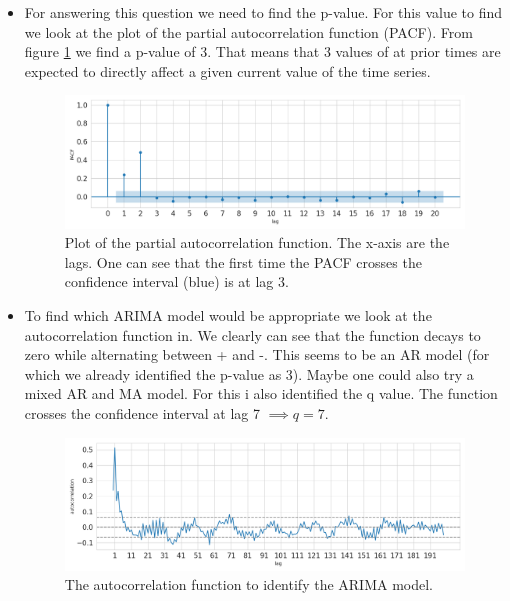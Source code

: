 \documentclass[]{article}
\begin{document}
\begin{itemize}
		\item For answering this question we need to find the p-value. For this value to find we look at the plot of the partial autocorrelation function (PACF). From figure \ref{fig:pacf} we find a p-value of 3. That means that 3 values of at prior times are expected to directly affect a given current value of the time series.
		\begin{figure}
			\centering
			\includegraphics[width=1\textwidth]{images/partialautocorrelation.png}
			\caption{Plot of the partial autocorrelation function. The x-axis are the lags. One can see that the first time the PACF crosses the confidence interval (blue) is at lag 3.}
			\label{fig:pacf}
		\end{figure}
		\item To find which ARIMA model would be appropriate we look at the autocorrelation function in. We clearly can see that the function decays to zero while alternating between + and -. This seems to be an AR model (for which we already identified the p-value as 3). Maybe one could also try a mixed AR and MA model. For this i also identified the q value. The function crosses the confidence interval at lag 7 $\implies q=7$. 
		\begin{figure}
			\centering
			\includegraphics[width=1\textwidth]{images/autocorrelation_identification.png}
			\caption{The autocorrelation function to identify the ARIMA model.}
			\label{fig:acf}
		\end{figure}
	\end{itemize}
	
\end{document}
